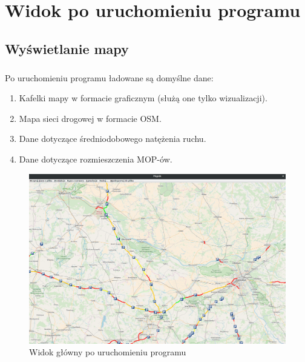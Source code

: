 \documentclass[10pt,paper=a4 BCOR0, DIV15]{scrbook} %
\renewcommand{\contentsname}{Instrukcja obsługi programu Mopnik}
\begin{document}
	
	\tableofcontents 


    \chapter{Widok po uruchomieniu programu}
    \section{Wyświetlanie mapy}
    \paragraph{}
    Po uruchomieniu programu ładowane są domyślne dane:
    \begin{enumerate}
    \item Kafelki mapy w formacie graficznym (służą one tylko wizualizacji).
    \item Mapa sieci drogowej w formacie OSM.
    \item Dane dotyczące średniodobowego natężenia ruchu.
    \item Dane dotyczące rozmieszczenia MOP-ów.
    \end{enumerate}
 \begin{figure}[ht]
      \centering
      \includegraphics[width=\textwidth]{widok_glowny.png}
      \caption{Widok główny po uruchomieniu programu}
    \end {figure}
    
\end{document}
